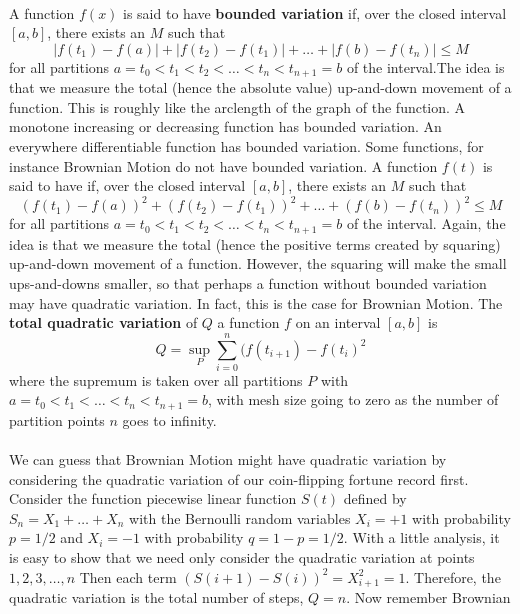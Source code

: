 \begin{problem}
  \\
  A function $f(x)$ is said to have \textbf{bounded variation} if, over the closed 
  interval $[a,b]$, there exists an $M$ such that
  \[
    | f(t_1) - f(a)| + |f(t_2) - f(t_1)| + \ldots + |f(b) - f(t_n)| \le M
  \]
  \ni  for all partitions $a = t_0 < t_1 < t_2 < \ldots < t_n < t_{n+1} = b$ 
  of the interval.The idea is that we measure the total (hence the absolute value)
  up-and-down movement of a function.  This is roughly like the arclength of the 
  graph of the function.  A monotone increasing or decreasing function has bounded 
  variation.  An everywhere differentiable function has bounded variation.  
  Some functions, for instance Brownian Motion do not have bounded variation. A function 
  $f(t)$ is said to have  if, over the closed interval $[a,b]$, 
  there exists an $M$ such that
  \[
    (f(t_1) - f(a))^2 + (f(t_2) - f(t_1))^2 + \ldots + (f(b) - f(t_n))^2\le M
  \]
  \ni for all partitions $a=t_0<t_1<t_2<\ldots < t_n < t_{n+1} = b$ of the interval.
  Again, the idea is that we measure the total (hence the positive terms
  created by squaring) up-and-down movement of a function.  However, the squaring will 
  make the small ups-and-downs smaller, so that perhaps a function without
  bounded variation may have quadratic variation.  In fact, this is the
  case for Brownian Motion. The \textbf{total quadratic variation} of $Q$ a function 
  $f$ on an interval $[a,b]$ is
  \[
    Q = \sup_{P} \sum_{i=0}^{n} (f(t_{i+1}) - f(t_{i})^2
  \]
  where the supremum is taken over all partitions $P$ with 
  $ a = t_0 < t _1 < \ldots < t_n < t_{n+1} = b$, with mesh size
  going to zero as the number of partition points $n$ goes to infinity. \\
  \ni{} \\
  \ni We can guess that Brownian Motion might have quadratic variation by
  considering the quadratic variation of our coin-flipping fortune record
  first.  Consider the function piecewise linear function $S(t)$ 
  defined by $S_n = X_1 + \ldots + X_n$ with the Bernoulli random variables 
  $X_i = +1$ with probability $p = 1/2$ and $X_i = -1$ with probability 
  $q = 1-p = 1/2$. With a little analysis, it is easy to show that we need
  only consider the quadratic variation at points $1,2,3, \ldots, n$
  Then each term $(S(i+1) - S(i))^2 = X_{i+1}^2 = 1$.  Therefore, the
  quadratic variation is the total number of steps, $Q=n$. Now remember Brownian 

\end{problem}
